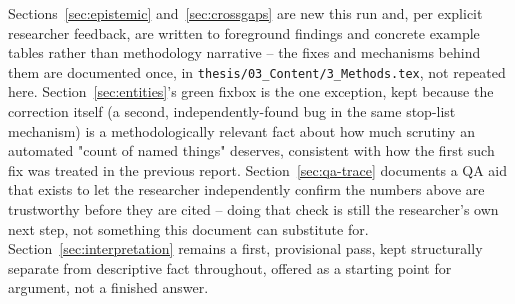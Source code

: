 \documentclass[11pt,a4paper]{article}
\begin{document}
Sections~\ref{sec:epistemic} and~\ref{sec:crossgaps} are new this run
and, per explicit researcher feedback, are written to foreground
findings and concrete example tables rather than methodology narrative
-- the fixes and mechanisms behind them are documented once, in
\texttt{thesis/03\_Content/3\_Methods.tex}, not repeated here.
Section~\ref{sec:entities}'s green fixbox is the one exception, kept
because the correction itself (a second, independently-found bug in the
same stop-list mechanism) is a methodologically relevant fact about how
much scrutiny an automated "count of named things" deserves, consistent
with how the first such fix was treated in the previous report.
Section~\ref{sec:qa-trace} documents a QA aid that exists to let the
researcher independently confirm the numbers above are trustworthy
before they are cited -- doing that check is still the researcher's own
next step, not something this document can substitute for.
Section~\ref{sec:interpretation} remains a first, provisional pass, kept
structurally separate from descriptive fact throughout, offered as a
starting point for argument, not a finished answer.
\end{document}
